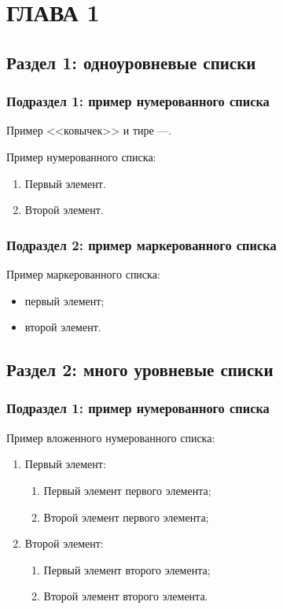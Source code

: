 \chapter{\label{ch:ch01}ГЛАВА 1} %

\section{\label{sec:ch01/sec01}Раздел 1: одноуровневые списки}

\subsection{\label{subsec:ch01/sec01/sub01}Подраздел 1: пример нумерованного списка}

Пример <<ковычек>> и тире ---.

Пример нумерованного списка:
\begin{enumerate}
\item Первый элемент.
\item Второй элемент.
\end{enumerate}

\subsection{\label{subsec:ch01/sec01/sub02}Подраздел 2: пример маркерованного списка}

Пример маркерованного списка:
\begin{itemize}
\item первый элемент;
\item второй элемент.
\end{itemize}

\section{\label{sec:ch01/sec02}Раздел 2: много уровневые списки}

\subsection{\label{subsec:ch01/sec02/sub01}Подраздел 1: пример нумерованного списка}

Пример вложенного нумерованного списка:
\begin{enumerate}
\item Первый элемент:
\begin{enumerate}
\item Первый элемент первого элемента;
\item Второй элемент первого элемента;
\end{enumerate}
\item Второй элемент:
\begin{enumerate}
\item Первый элемент второго элемента;
\item Второй элемент второго элемента.
\end{enumerate}
\end{enumerate}

